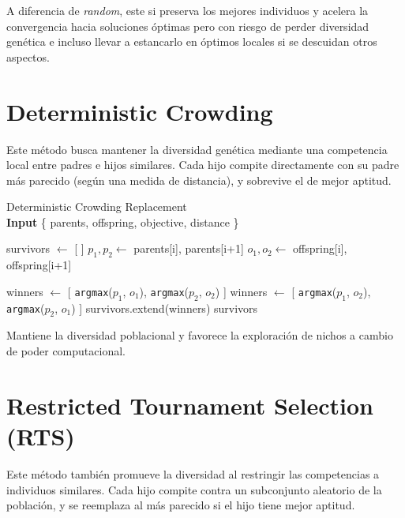 A diferencia de \textit{random}, este si preserva los mejores individuos y acelera la convergencia hacia soluciones óptimas pero con riesgo de perder diversidad genética e incluso llevar a estancarlo en óptimos locales si se descuidan otros aspectos.

\section{Deterministic Crowding}

Este método busca mantener la diversidad genética mediante una competencia local entre padres e hijos similares. Cada hijo compite directamente con su padre más parecido (según una medida de distancia), y sobrevive el de mejor aptitud.

\begin{algorithm}[H]
	\caption{Deterministic Crowding Replacement \\ \textbf{Input} \{ parents, offspring, objective, distance \}}
	\begin{algorithmic}[1]
		\State survivors $\gets$ [ ]
		\State $p_1, p_2 \gets$ parents[i], parents[i+1]
		\State $o_1, o_2 \gets$ offspring[i], offspring[i+1]
		
		\State winners $\gets$ [ \texttt{argmax}($p_1$, $o_1$), \texttt{argmax}($p_2$, $o_2$) ]
		\Else
		\State winners $\gets$ [ \texttt{argmax}($p_1$, $o_2$), \texttt{argmax}($p_2$, $o_1$) ]
		\EndIf
		\State survivors.extend(winners)
		\EndFor
		\State \Return survivors
		\EndFunction
	\end{algorithmic}
	\label{alg:replacement_deterministic_crowding}
\end{algorithm}

Mantiene la diversidad poblacional y favorece la exploración de nichos a cambio de poder computacional.

\section{Restricted Tournament Selection (RTS)}

Este método también promueve la diversidad al restringir las competencias a individuos similares. Cada hijo compite contra un subconjunto aleatorio de la población, y se reemplaza al más parecido si el hijo tiene mejor aptitud.

